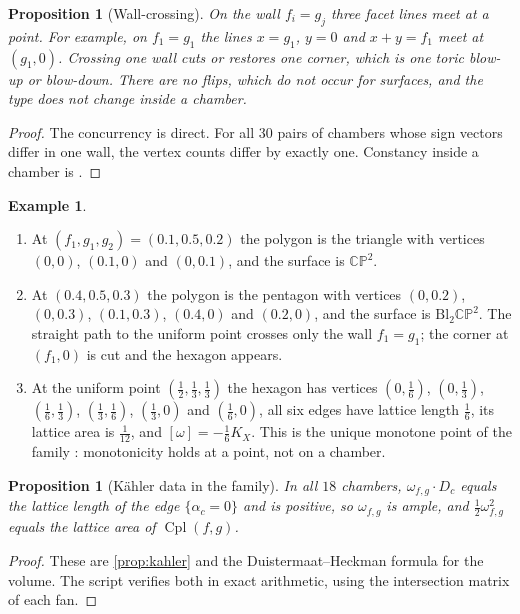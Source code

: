 \documentclass[11pt]{article}
\newtheorem{proposition}[theorem]{Proposition}
\theoremstyle{definition}
\newtheorem{example}[theorem]{Example}
\theoremstyle{remark}
\newcommand{\Cpl}{\operatorname{Cpl}}
\newcommand{\CP}{\mathbb{CP}}
\begin{document}
\begin{proposition}[Wall-crossing]\label{prop:wall}
On the wall $f_i=g_j$ three facet lines meet at a point. For example, on $f_1=g_1$ the lines $x=g_1$,
$y=0$ and $x+y=f_1$ meet at $(g_1,0)$. Crossing one wall cuts or restores one corner, which is one toric
blow-up or blow-down. There are no flips, which do not occur for surfaces, and the type does not change
inside a chamber.
\end{proposition}
\begin{proof}
The concurrency is direct. For all $30$ pairs of chambers whose sign vectors differ in one wall, the
vertex counts differ by exactly one. Constancy inside a chamber is \cite[Prop.~6.6]{Conditionals}.
\end{proof}

\begin{example}\label{ex:2x3}
\leavevmode
\begin{enumerate}[label=(\alph*),leftmargin=*]
\item At $(f_1,g_1,g_2)=(0.1,0.5,0.2)$ the polygon is the triangle with vertices $(0,0)$, $(0.1,0)$ and
  $(0,0.1)$, and the surface is $\CP^2$.
\item At $(0.4,0.5,0.3)$ the polygon is the pentagon with vertices $(0,0.2)$, $(0,0.3)$, $(0.1,0.3)$,
  $(0.4,0)$ and $(0.2,0)$, and the surface is $\mathrm{Bl}_2\CP^2$. The straight path to the uniform point
  crosses only the wall $f_1=g_1$; the corner at $(f_1,0)$ is cut and the hexagon appears.
\item At the uniform point $(\tfrac12,\tfrac13,\tfrac13)$ the hexagon has vertices $(0,\tfrac16)$, $(0,\tfrac13)$,
  $(\tfrac16,\tfrac13)$, $(\tfrac13,\tfrac16)$, $(\tfrac13,0)$ and $(\tfrac16,0)$, all six edges have lattice length
  $\tfrac16$, its lattice area is $\tfrac1{12}$, and $[\omega]=-\tfrac16K_X$. This is the unique monotone point of
  the family \cite[Prop.~6.7]{Conditionals}: monotonicity holds at a point, not on a chamber.
\end{enumerate}
\end{example}

\begin{proposition}[Kähler data in the family]\label{prop:kahler2x3}
In all $18$ chambers, $\omega_{f,g}\cdot D_c$ equals the lattice length of the edge $\{\alpha_c=0\}$ and is
positive, so $\omega_{f,g}$ is ample, and $\tfrac12\omega_{f,g}^2$ equals the lattice area of $\Cpl(f,g)$.
\end{proposition}
\begin{proof}
These are \cref{prop:kahler} and the Duistermaat--Heckman formula for the volume. The script verifies
both in exact arithmetic, using the intersection matrix of each fan.
\end{proof}
\end{document}
